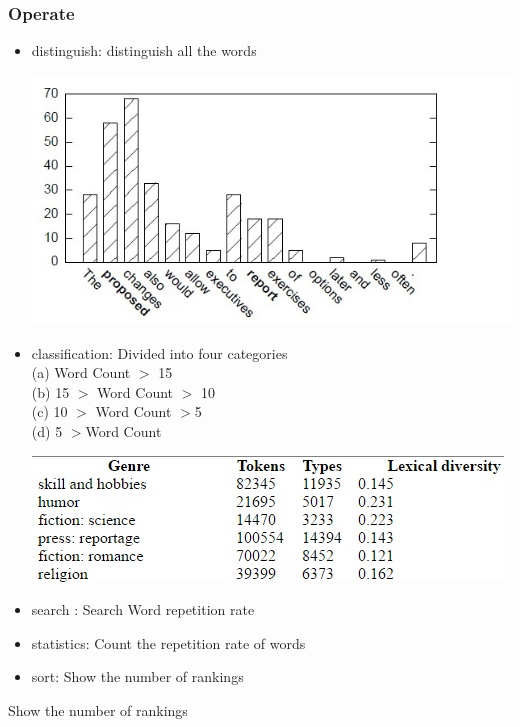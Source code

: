 \subsubsection*{Operate}
\begin{itemize}
	\item distinguish: distinguish all the words
	\begin{center}
		\includegraphics[width=\columnwidth]{union_01.jpg}
	\end{center}
	\item classification: Divided into four categories\\ 	
	(a)  Word Count $>$ 15\\
	(b)  15 $>$ Word Count $>$ 10\\
	(c)  10 $>$ Word Count $>$5\\
	(d)  5 $>$Word Count	
	\begin{center}
		\includegraphics[width=\columnwidth]{union_02.jpg}
	\end{center}
	\item search : Search Word repetition rate
	\item statistics: Count the repetition rate of words
	\item sort: Show the number of rankings
\end{itemize}
Show the number of rankings \\

